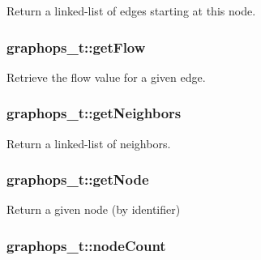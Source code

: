 Return a linked-\/list of edges starting at this node. 

\subsubsection[{\texorpdfstring{get\+Flow}{getFlow}}]{ graphops\+\_\+t\+::get\+Flow}\hypertarget{structgraphops__t_adda43f12be5d13e127c0fa79454dd92f}{}\label{structgraphops__t_adda43f12be5d13e127c0fa79454dd92f}


Retrieve the flow value for a given edge. 

\subsubsection[{\texorpdfstring{get\+Neighbors}{getNeighbors}}]{ graphops\+\_\+t\+::get\+Neighbors}\hypertarget{structgraphops__t_ac6c5bec2f102e4da5959cc3db66ac3c6}{}\label{structgraphops__t_ac6c5bec2f102e4da5959cc3db66ac3c6}


Return a linked-\/list of neighbors. 

\subsubsection[{\texorpdfstring{get\+Node}{getNode}}]{ graphops\+\_\+t\+::get\+Node}\hypertarget{structgraphops__t_ab410442ef123fc79f1c8a431502e2a23}{}\label{structgraphops__t_ab410442ef123fc79f1c8a431502e2a23}


Return a given node (by identifier) 

\subsubsection[{\texorpdfstring{node\+Count}{nodeCount}}]{ graphops\+\_\+t\+::node\+Count}\hypertarget{structgraphops__t_a07801b43de87d48f426d7abf7959e738}{}\label{structgraphops__t_a07801b43de87d48f426d7abf7959e738}



